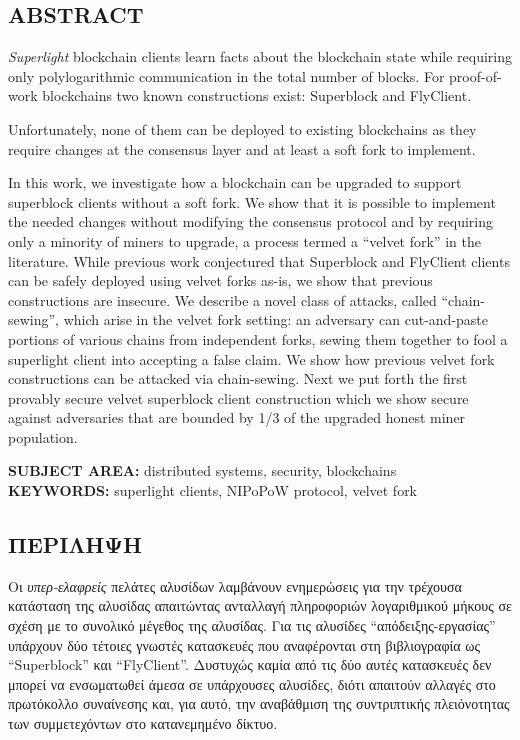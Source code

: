 \begin{center}
    \section*{ABSTRACT}
\end{center}
{\em Superlight} blockchain clients
learn facts about the blockchain state
while requiring only polylogarithmic communication in the total
number of blocks.
For proof-of-work blockchains
two known constructions exist: Superblock and FlyClient.

Unfortunately, none of them can be deployed to existing blockchains as they require changes at the consensus layer and at least a soft fork to implement.

In this work, we
investigate how a blockchain can be upgraded to support superblock clients without a soft fork. We show that it is possible to implement the needed changes without modifying the consensus protocol and by requiring only a minority of miners to upgrade, a process termed a ``velvet fork'' in the literature. While previous work conjectured that Superblock and FlyClient clients can be safely deployed using velvet forks as-is, we show that previous constructions are insecure. We describe a novel class of attacks, called  ``chain-sewing'', which arise in the velvet fork setting: an adversary can cut-and-paste portions of various chains from independent forks, sewing them together to
fool a superlight client into accepting a false claim.
We show how previous velvet fork constructions can be attacked via chain-sewing.
Next we put forth the first provably secure velvet superblock client construction which we show  secure against adversaries that are bounded by 1/3 of the upgraded honest miner population.

\vspace{11cm}
\noindent
\textbf{SUBJECT AREA:} distributed systems, security, blockchains\\
\textbf{KEYWORDS:} superlight clients, NIPoPoW protocol, velvet fork

\newpage
\begin{center}
    \section*{ΠΕΡIΛΗΨΗ}
\end{center}
Οι \emph{υπερ-ελαφρείς} πελάτες αλυσίδων λαμβάνουν ενημερώσεις για την τρέχουσα κατάσταση της αλυσίδας απαιτώντας ανταλλαγή πληροφοριών λογαριθμικού μήκους σε σχέση με το συνολικό μέγεθος της αλυσίδας. Για τις αλυσίδες ``απόδειξης-εργασίας'' υπάρχουν δύο τέτοιες γνωστές κατασκευές που αναφέρονται στη βιβλιογραφία ως ``Superblock'' και ``FlyClient''. Δυστυχώς καμία από τις δύο αυτές κατασκευές δεν μπορεί να ενσωματωθεί άμεσα σε υπάρχουσες αλυσίδες, διότι απαιτούν αλλαγές στο πρωτόκολλο συναίνεσης και, για αυτό, την αναβάθμιση της συντριπτικής πλειόνοτητας των συμμετεχόντων στο κατανεμημένο δίκτυο. 

